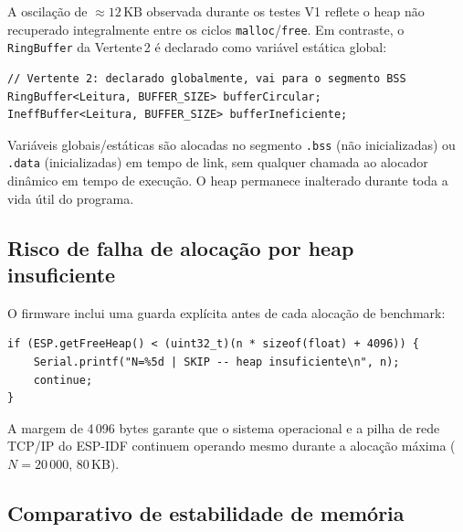 \documentclass[12pt, a4paper]{article}
\theoremstyle{definition}
\theoremstyle{remark}
\begin{document}
A oscilação de $\approx 12\,\text{KB}$ observada durante os testes V1 reflete
o heap não recuperado integralmente entre os ciclos \texttt{malloc}/\texttt{free}.
Em contraste, o \texttt{RingBuffer} da Vertente\,2 é declarado como variável
estática global:

\begin{lstlisting}[caption={Alocação estática do RingBuffer — sem impacto no heap}]
// Vertente 2: declarado globalmente, vai para o segmento BSS
RingBuffer<Leitura, BUFFER_SIZE> bufferCircular;
IneffBuffer<Leitura, BUFFER_SIZE> bufferIneficiente;
\end{lstlisting}

Variáveis globais/estáticas são alocadas no segmento \texttt{.bss} (não
inicializadas) ou \texttt{.data} (inicializadas) em tempo de link, sem
qualquer chamada ao alocador dinâmico em tempo de execução. O heap permanece
inalterado durante toda a vida útil do programa.

\subsection{Risco de falha de alocação por heap insuficiente}

O firmware inclui uma guarda explícita antes de cada alocação de benchmark:

\begin{lstlisting}[caption={Guarda de heap antes de malloc no benchmark}]
if (ESP.getFreeHeap() < (uint32_t)(n * sizeof(float) + 4096)) {
    Serial.printf("N=%5d | SKIP -- heap insuficiente\n", n);
    continue;
}
\end{lstlisting}

A margem de 4\,096 bytes garante que o sistema operacional e a pilha de
rede TCP/IP do ESP-IDF continuem operando mesmo durante a alocação máxima
($N = 20\,000$, 80\,KB).

\subsection{Comparativo de estabilidade de memória}
\end{document}
